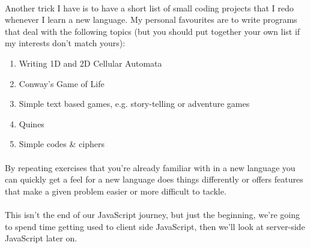 \documentclass[10pt, a4paper]{article}
\begin{document}
\paragraph{} Another trick I have is to have a short list of small coding projects that I redo whenever I learn a new language. My personal favourites are to write programs that deal with the following topics (but you should put together your own list if my interests don't match yours):
\begin{enumerate}
\item Writing 1D and 2D Cellular Automata
\item Conway's Game of Life
\item Simple text based games, e.g. story-telling or adventure games
\item Quines
\item Simple codes \& ciphers
\end{enumerate}

\paragraph{} By repeating exercises that you're already familiar with in a new language you can quickly get a feel for a new language does things differently or offers features that make a given problem easier or more difficult to tackle.

\paragraph{} This isn't the end of our JavaScript journey, but just the beginning, we're going to spend time getting used to client side JavaScript, then we'll look at server-side JavaScript later on.
\end{document}
